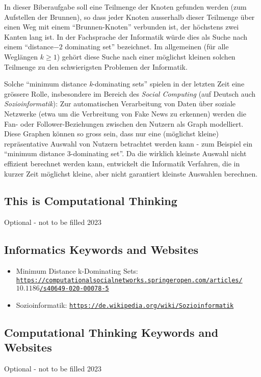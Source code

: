 \documentclass[a4paper,11pt]{report}
\newcommand{\BrochureUrlText}[1]{\texttt{#1}}
\begin{document}
In dieser Biberaufgabe soll eine Teilmenge der Knoten gefunden werden (zum Aufstellen der Brunnen), so dass jeder Knoten ausserhalb dieser Teilmenge über einen Weg mit einem \enquote{Brunnen-Knoten} verbunden ist, der höchstens zwei Kanten lang ist.  In der Fachsprache der Informatik würde dies als Suche nach einem \enquote{distance$-2$ dominating set} bezeichnet. Im allgemeinen (für alle Weglängen ${k \geq 1}$) gehört diese Suche nach einer möglichst kleinen solchen Teilmenge zu den schwierigsten Problemen der Informatik.

Solche \enquote{minimum distance \emph{k}-dominating sets} spielen in der letzten Zeit eine grössere Rolle, insbesondere im Bereich des \emph{Social Computing} (auf Deutsch auch \emph{Sozioinformatik}):
Zur automatischen Verarbeitung von Daten über soziale Netzwerke (etwa um die Verbreitung von Fake News zu erkennen)
werden die Fan- oder Follower-Beziehungen zwischen den Nutzern als Graph modelliert.
Diese Graphen können so gross sein, dass nur eine (möglichst kleine) repräsentative Auswahl von Nutzern betrachtet werden kann - zum Beispiel ein \enquote{minimum distance 3-dominating set}.
Da die wirklich kleinste Auswahl nicht effizient berechnet werden kann, entwickelt die Informatik Verfahren,
die in kurzer Zeit möglichst kleine, aber nicht garantiert kleinste Auswahlen berechnen.


\subsection*{This is Computational Thinking}

Optional - not to be filled 2023


\subsection*{Informatics Keywords and Websites}

\begin{itemize}
  \item Minimum Distance k-Dominating Sets: \href{https://computationalsocialnetworks.springeropen.com/articles/10.1186/s40649-020-00078-5}{\BrochureUrlText{https://computationalsocialnetworks.springeropen.com/articles/$10.1186$/s40649-020-00078-5}}
  \item Sozioinformatik: \href{https://de.wikipedia.org/wiki/Sozioinformatik}{\BrochureUrlText{https://de.wikipedia.org/wiki/Sozioinformatik}}
\end{itemize}


\subsection*{Computational Thinking Keywords and Websites}

Optional - not to be filled 2023
\end{document}
